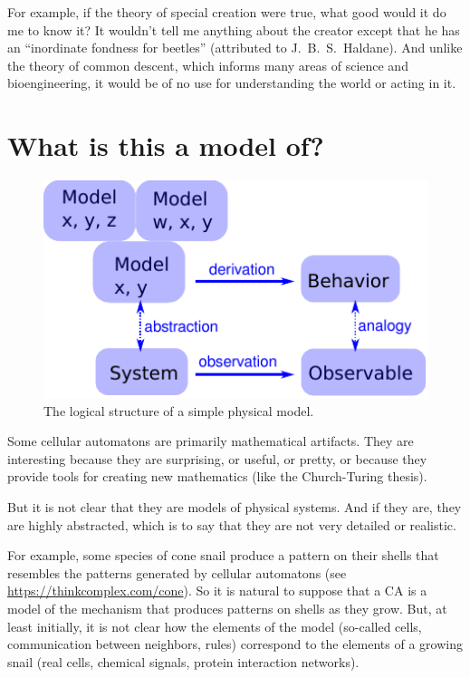 \documentclass[12pt]{book}
\theoremstyle{exercise}
\begin{document}

For example, if the theory of special creation were true, what good
would it do me to know it?  It wouldn't tell me anything about the
creator except that he has an ``inordinate fondness for beetles''
(attributed to J.~B.~S.~Haldane).  And unlike the
theory of common descent, which informs many areas of science
and bioengineering, it would be of no use for understanding
the world or acting in it.



\section{What is this a model of?}
\label{model3}

\begin{figure}
\centerline{\includegraphics[height=2.5in]{figs/model3.pdf}}
\caption{The logical structure of a simple physical model.}
\label{fig.model3}
\end{figure}

Some cellular automatons are primarily mathematical artifacts.  They are
interesting because they are surprising, or useful, or pretty, or
because they provide tools for creating new mathematics (like the
Church-Turing thesis).


But it is not clear that they are models of physical systems.  And if
they are, they are highly abstracted, which is to say that they are
not very detailed or realistic.


For example, some species of cone snail produce a pattern on their
shells that resembles the patterns generated by cellular automatons
(see \url{https://thinkcomplex.com/cone}).  So it is natural to
suppose that a CA is a model of the mechanism that produces patterns
on shells as they grow.  But, at least initially, it is not clear how
the elements of the model (so-called cells, communication between
neighbors, rules) correspond to the elements of a growing snail (real
cells, chemical signals, protein interaction networks).
\end{document}
